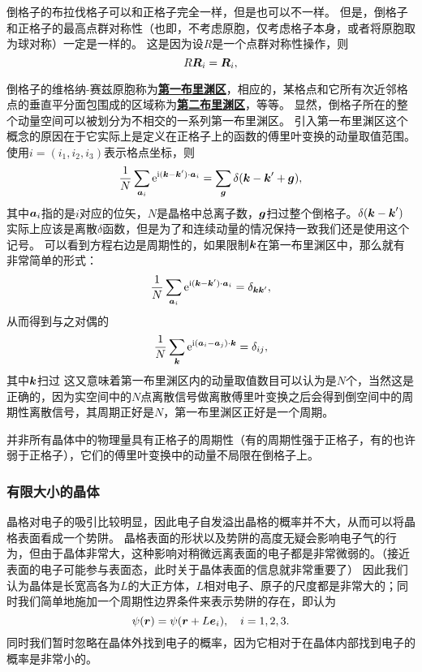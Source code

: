\documentclass[hyperref, UTF8, a4paper]{ctexart}
\newcommand*{\ii}{\mathrm{i}}
\newcommand*{\ee}{\mathrm{e}}
\newcommand*{\concept}[1]{\underline{\textbf{#1}}}
\begin{document}
倒格子的布拉伐格子可以和正格子完全一样，但是也可以不一样。
但是，倒格子和正格子的最高点群对称性（也即，不考虑原胞，仅考虑格子本身，或者将原胞取为球对称）一定是一样的。
这是因为设$R$是一个点群对称性操作，则
\[
    R \vb*{R}_i = \vb*{R}_i,
\]

倒格子的维格纳-赛兹原胞称为\concept{第一布里渊区}，相应的，某格点和它所有次近邻格点的垂直平分面包围成的区域称为\concept{第二布里渊区}，等等。
显然，倒格子所在的整个动量空间可以被划分为不相交的一系列第一布里渊区。
引入第一布里渊区这个概念的原因在于它实际上是定义在正格子上的函数的傅里叶变换的动量取值范围。
使用$i=(i_1, i_2, i_3)$表示格点坐标，则
\begin{equation}
    \frac{1}{N} \sum_{\vb*{a}_i} \ee^{\ii (\vb*{k} - \vb*{k}') \cdot \vb*{a}_i} = \sum_{\vb*{g}} \delta(\vb*{k} - \vb*{k}' + \vb*{g}),
\end{equation}
其中$\vb*{a}_i$指的是$i$对应的位矢，$N$是晶格中总离子数，$\vb*{g}$扫过整个倒格子。$\delta(\vb*{k} - \vb*{k}')$实际上应该是离散$\delta$函数，但是为了和连续动量的情况保持一致我们还是使用这个记号。
可以看到方程右边是周期性的，如果限制$\vb*{k}$在第一布里渊区中，那么就有非常简单的形式：
\begin{equation}
    \frac{1}{N} \sum_{\vb*{a}_i} \ee^{\ii (\vb*{k} - \vb*{k}') \cdot \vb*{a}_i} = \delta_{\vb*{k} \vb*{k}'},
\end{equation}
从而得到与之对偶的
\[
    \frac{1}{N} \sum_{\vb*{k}} \ee^{\ii (\vb*{a}_i - \vb*{a}_j) \cdot \vb*{k}} = \delta_{ij},
\]
其中$\vb*{k}$扫过
这又意味着第一布里渊区内的动量取值数目可以认为是$N$个，当然这是正确的，因为实空间中的$N$点离散信号做离散傅里叶变换之后会得到倒空间中的周期性离散信号，其周期正好是$N$，第一布里渊区正好是一个周期。

并非所有晶体中的物理量具有正格子的周期性（有的周期性强于正格子，有的也许弱于正格子），它们的傅里叶变换中的动量不局限在倒格子上。

\subsubsection{有限大小的晶体}

晶格对电子的吸引比较明显，因此电子自发溢出晶格的概率并不大，从而可以将晶格表面看成一个势阱。
晶格表面的形状以及势阱的高度无疑会影响电子气的行为，但由于晶体非常大，这种影响对稍微远离表面的电子都是非常微弱的。（接近表面的电子可能参与表面态，此时关于晶体表面的信息就非常重要了）
因此我们认为晶体是长宽高各为$L$的大正方体，$L$相对电子、原子的尺度都是非常大的；同时我们简单地施加一个周期性边界条件来表示势阱的存在，即认为
\begin{equation}
    \psi(\vb*{r}) = \psi(\vb*{r} + L \vb*{e}_i), \quad i = 1, 2, 3.
    \label{eq:periodic-boundary}
\end{equation}
同时我们暂时忽略在晶体外找到电子的概率，因为它相对于在晶体内部找到电子的概率是非常小的。
\end{document}
